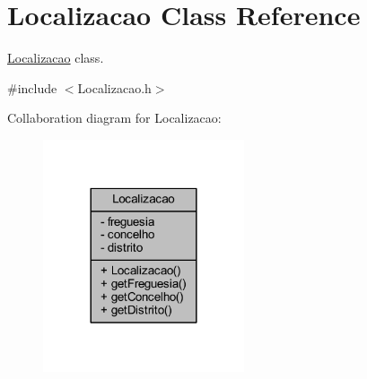 \hypertarget{class_localizacao}{}\section{Localizacao Class Reference}
\label{class_localizacao}


\hyperlink{class_localizacao}{Localizacao} class.  




{\ttfamily \#include $<$Localizacao.\+h$>$}



Collaboration diagram for Localizacao\+:
\nopagebreak
\begin{figure}[H]
\begin{center}
\leavevmode
\includegraphics[width=168pt]{class_localizacao__coll__graph}
\end{center}
\end{figure}
